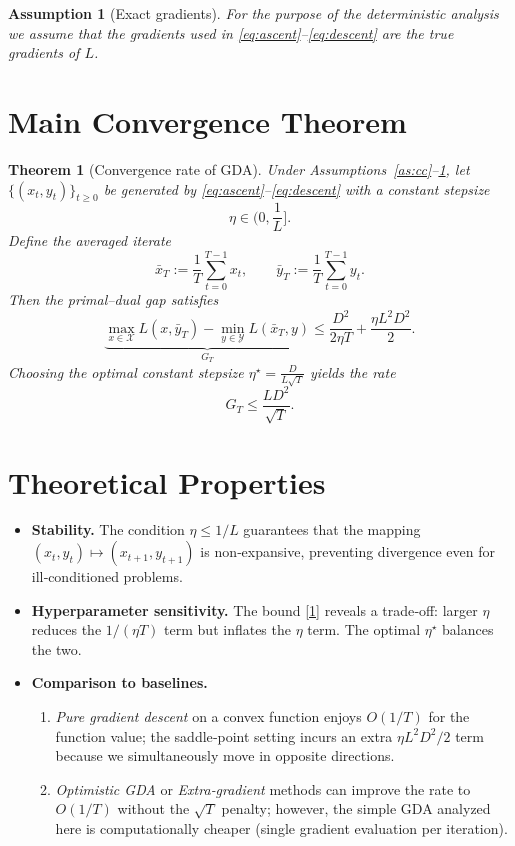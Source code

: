 \documentclass{article}
\newtheorem{theorem}{Theorem}
\newtheorem{assumption}{Assumption}
\begin{document}
\begin{assumption}[Exact gradients]\label{as:exact}
For the purpose of the deterministic analysis we assume that the gradients used in \eqref{eq:ascent}–\eqref{eq:descent} are the true gradients of $L$.
\end{assumption}

\newpage
\section*{Main Convergence Theorem}
\begin{theorem}[Convergence rate of GDA]\label{thm:rate}
Under Assumptions~\ref{as:cc}–\ref{as:exact}, let $\{(x_t,y_t)\}_{t\ge0}$ be generated by \eqref{eq:ascent}–\eqref{eq:descent} with a constant stepsize
\[
    \eta\in\Big(0,\frac{1}{L}\Big].
\]
Define the averaged iterate
\[
    \bar x_T:=\frac1T\sum_{t=0}^{T-1}x_t,\qquad 
    \bar y_T:=\frac1T\sum_{t=0}^{T-1}y_t .
\]
Then the primal–dual gap satisfies
\[
    \underbrace{\max_{x\in\mathcal{X}}L(x,\bar y_T)-\min_{y\in\mathcal{Y}}L(\bar x_T,y)}_{\displaystyle G_T}
    \le \frac{D^2}{2\eta T}+ \frac{\eta L^2 D^2}{2}.
\tag{1}
\]
Choosing the optimal constant stepsize $\eta^\star = \frac{D}{L\sqrt{T}}$ yields the rate
\[
    G_T \le \frac{LD^2}{\sqrt{T}} .
\tag{2}
\]
\end{theorem}

\section*{Theoretical Properties}
\begin{itemize}
    \item \textbf{Stability.} The condition $\eta\le 1/L$ guarantees that the mapping $(x_t,y_t)\mapsto (x_{t+1},y_{t+1})$ is non‑expansive, preventing divergence even for ill‑conditioned problems.
    \item \textbf{Hyperparameter sensitivity.} The bound \eqref{1} reveals a trade‑off: larger $\eta$ reduces the $1/(\eta T)$ term but inflates the $\eta$ term. The optimal $\eta^\star$ balances the two.
    \item \textbf{Comparison to baselines.}
          \begin{enumerate}
              \item \emph{Pure gradient descent} on a convex function enjoys $O(1/T)$ for the function value; the saddle‑point setting incurs an extra $\eta L^2 D^2/2$ term because we simultaneously move in opposite directions.
              \item \emph{Optimistic GDA} or \emph{Extra‑gradient} methods can improve the rate to $O(1/T)$ without the $\sqrt{T}$ penalty; however, the simple GDA analyzed here is computationally cheaper (single gradient evaluation per iteration).
          \end{enumerate}
\end{itemize}
\end{document}
